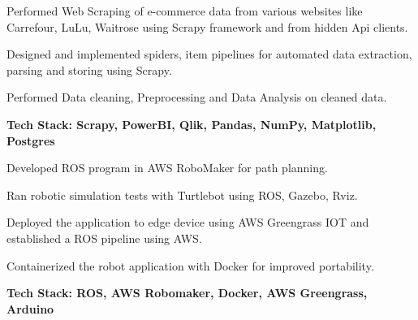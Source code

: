 \documentclass[letterpaper]{deedy-resume} %
\begin{document}
\begin{minipage}[t]{0.66\textwidth} %




\begin{tightitemize}
\item Performed Web Scraping of e-commerce data from various websites like Carrefour, LuLu, Waitrose using Scrapy framework and from hidden Api clients.        
\item Designed and implemented spiders, item pipelines for automated data extraction, parsing and storing using Scrapy.        
\item Performed Data cleaning, Preprocessing and Data Analysis on cleaned data.
\item \textbf{Tech Stack: Scrapy, PowerBI, Qlik, Pandas, NumPy, Matplotlib, Postgres}
\end{tightitemize}

\sectionspace %



\begin{tightitemize}
\item Developed ROS program in AWS RoboMaker for path planning.
\item Ran robotic simulation tests with Turtlebot using ROS, Gazebo, Rviz.
\item Deployed the application to edge device using AWS Greengrass IOT and established a ROS pipeline using AWS.
\item Containerized the robot application with Docker for improved portability.
\item \textbf{Tech Stack: ROS, AWS Robomaker, Docker, AWS Greengrass, Arduino}
      
\end{tightitemize}

\sectionspace %


\end{minipage}
\end{document}
